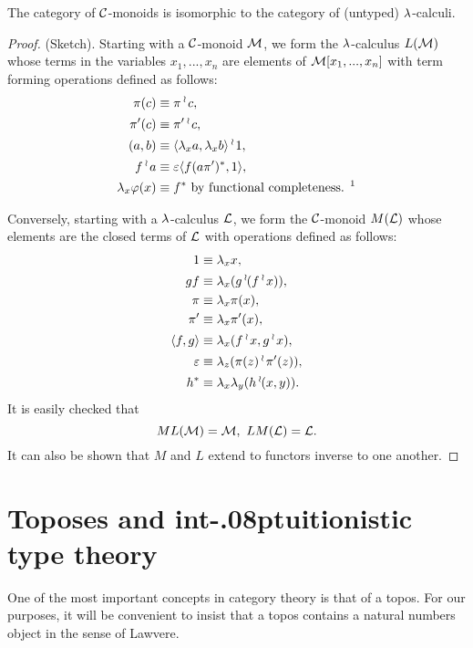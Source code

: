 \begin{thm}
The category of $\mathcal C$-monoids is isomorphic to the category of
(untyped) $\lambda$-calculi.
\end{thm}

\begin{proof}
(Sketch). Starting with a $\mathcal C$-monoid ${\mathcal M}$, we form the $\lambda$-calculus
$L({\mathcal M})$ whose terms in the variables $x_1, ... , x_n$ are elements of ${\mathcal M}[x_1,...,x_n]$
with term forming operations defined as follows:
\begin{align*}
\pi(c) & \equiv \pi \app c,\\
\pi' (c) & \equiv \pi' \app c,\\
(a,b) & \equiv \la \lx a, \lx b\ra \app 1,\\
f \app a & \equiv \ev \la f(a \pi')^*,1 \ra,\\
\lx \pf(x) &\equiv f^* \,\, \text{by functional completeness.%
\footnotemark}
\end{align*}

Conversely, starting with a $\lambda$-calculus ${\mathcal L}$, we form the $\mathcal C$-monoid $M({\mathcal L})$
whose elements are the closed terms of ${\mathcal L}$ with operations defined as follows:
\begin{align*}
1 &\equiv \lambda_x x,\\
gf &\equiv \lambda_x (g\mathop{{}^\wr}\kern-.8pt (f\mathop{{}^\wr}\kern-.8pt x)),\\
\pi & \equiv \lambda_x \pi(x),\\
\pi' & \equiv \lambda_x \pi'(x),\\
\langle f,g \rangle &\equiv \lambda_x (f\mathop{{}^\wr}\kern-.8pt x, g \mathop{{}^\wr}\kern-.8pt x),\\
\varepsilon & \equiv \lambda_z (\pi(z) \mathop{{}^\wr}\kern-.8pt \pi'(z)),\\
h^* & \equiv \lambda_x\lambda_y(h \mathop{{}^\wr}\kern-.8pt (x,y)).
\end{align*}
It is easily checked that
\[
ML({\mathcal M}) = {\mathcal M}, \,\, LM({\mathcal L}) = {\mathcal L}.
\]
It can also be shown that $M$ and $L$ extend to functors inverse to one
another.
\end{proof}

\section{Toposes and int{\kern-.08pt}uitionistic type theory}

One of the most important concepts in category theory is that of a topos.
For our purposes, it will be convenient to insist that a topos contains a
natural numbers object in the sense of Lawvere.

